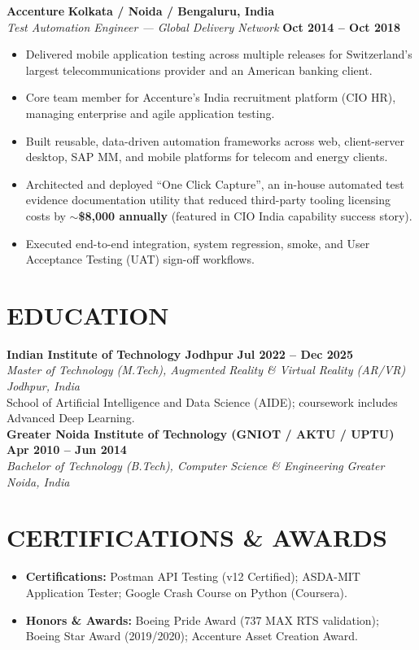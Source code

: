 \documentclass[10pt,a4paper]{article}
\begin{document}
\newpage

\noindent
\textbf{Accenture} \hfill \textbf{Kolkata / Noida / Bengaluru, India}\\
\textit{Test Automation Engineer --- Global Delivery Network} \hfill \textbf{Oct 2014 -- Oct 2018}
\begin{itemize}[leftmargin=*,noitemsep,topsep=1.5pt]
    \item Delivered mobile application testing across multiple releases for Switzerland's largest telecommunications provider and an American banking client.
    \item Core team member for Accenture's India recruitment platform (CIO HR), managing enterprise and agile application testing.
    \item Built reusable, data-driven automation frameworks across web, client-server desktop, SAP MM, and mobile platforms for telecom and energy clients.
    \item Architected and deployed ``One Click Capture'', an in-house automated test evidence documentation utility that reduced third-party tooling licensing costs by \textbf{$\sim$\$8,000 annually} (featured in CIO India capability success story).
    \item Executed end-to-end integration, system regression, smoke, and User Acceptance Testing (UAT) sign-off workflows.
\end{itemize}

\section{EDUCATION}
\small
\noindent
\textbf{Indian Institute of Technology Jodhpur} \hfill \textbf{Jul 2022 -- Dec 2025}\\
\textit{Master of Technology (M.Tech), Augmented Reality \& Virtual Reality (AR/VR)} \hfill \textit{Jodhpur, India}\\
School of Artificial Intelligence and Data Science (AIDE); coursework includes Advanced Deep Learning.\\[3pt]
\textbf{Greater Noida Institute of Technology (GNIOT / AKTU / UPTU)} \hfill \textbf{Apr 2010 -- Jun 2014}\\
\textit{Bachelor of Technology (B.Tech), Computer Science \& Engineering} \hfill \textit{Greater Noida, India}

\section{CERTIFICATIONS \& AWARDS}
\small
\begin{itemize}[leftmargin=*,noitemsep,topsep=1.5pt]
    \item \textbf{Certifications:} Postman API Testing (v12 Certified); ASDA-MIT Application Tester; Google Crash Course on Python (Coursera).
    \item \textbf{Honors \& Awards:} Boeing Pride Award (737 MAX RTS validation); Boeing Star Award (2019/2020); Accenture Asset Creation Award.
\end{itemize}
\end{document}

